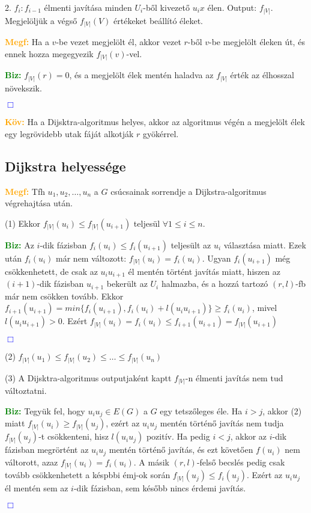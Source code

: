 \documentclass[12pt]{article}
\begin{document}
			2. $f_i:f_{i-1}$ élmenti javítása minden $U_i$-ből kivezető $u_ix$ élen. Output: $f_{|V|}$. Megjelöljük a végső $f_{|V|}(V)$ értékeket beállító éleket.
			
			\textcolor{orange}{\textbf{Megf:}} Ha a $v$-be vezet megjelölt él, akkor vezet $r$-ből $v$-be megjelölt éleken út, és ennek hozza megegyezik $f_{|V|} (v)$-vel.

			\textcolor{green}{\textbf{Biz:}} $f_{|V|} (r) = 0$, és a megjelölt élek mentén haladva az $f_{|V|}$ érték az élhosszal növekszik. \raggedright \textcolor{blue}{$\Box$}

			\textcolor{orange}{\textbf{Köv:}} Ha a Dijsktra-algoritmus helyes, akkor az algoritmus végén a megjelölt élek egy legrövidebb utak fáját alkotják $r$ gyökérrel.

		\subsection{Dijkstra helyessége}
				
			\textcolor{orange}{\textbf{Megf:}} Tfh $u_1, u_2, \dots, u_n$ a $G$ csúcsainak sorrendje a Dijkstra-algoritmus végrehajtása után. 

			(1) Ekkor $f_{|V|}(u_i) \leq f_{|V|}(u_{i+1})$ teljesül $\forall 1 \leq i \leq n$.

			\textcolor{green}{\textbf{Biz:}} Az $i$-dik fázisban $f_i(u_i) \leq f_i(u_{i+1})$ teljesült az $u_i$ választása miatt. Ezek után $f_i(u_i)$ már nem változott: $f_{|V|}(u_i) = f_i(u_i)$. Ugyan $f_i(u_{i+1})$ még csökkenhetett, de csak az $u_iu_{i+1}$ él mentén történt javítás miatt, hiszen az $(i+1)$-dik fázisban $u_{i+1}$ bekerült az $U_i$ halmazba, és a hozzá tartozó $(r,l)$-fb már nem csökken tovább. Ekkor $f_{i+1}(u_{i+1}) = min \{f_i(u_{i+1}),f_i(u_i)+l(u_iu_{i+1})\} \geq f_i(u_i)$, mivel $l(u_iu_{i+1}) > 0$. Ezért $f_{|V|}(u_i) = f_i(u_i) \leq f_{i+1}(u_{i+1}) = f_{|V|}(u_{i+1})$ \raggedright \textcolor{blue}{$\Box$}

			(2) $f_{|V|}(u_1) \leq f_{|V|}(u_2) \leq \dots \leq f_{|V|}(u_n)$

			(3) A Dijsktra-algoritmus outputjaként kaptt $f_{|V|}$-n élmenti javítás nem tud változtatni.
 
			\textcolor{green}{\textbf{Biz:}} Tegyük fel, hogy $u_iu_j \in E(G)$ a $G$ egy tetszőleges éle. Ha $i > j$, akkor (2) miatt $f_{|V|}(u_i) \geq f_{|V|}(u_j)$, ezért az $u_iu_j$ mentén történő javítás nem tudja $f_{|V|}(u_j)$-t csökkenteni, hisz $l(u_iu_j)$ pozitív. Ha pedig $i < j$, akkor az $i$-dik fázisban megrörtént az $u_iu_j$ mentén történő javítás, és ezt követően $f(u_i)$  nem váltorott, azaz $f_{|V|}(u_i) = f_i(u_i)$. A másik $(r,l)$-felső becslés pedig csak tovább csökkenhetett a késpbbi émj-ok során $f_{|V|}(u_j) \leq f_i(u_j)$. Ezért az $u_iu_j$ él mentén sem az $i$-dik fázisban, sem később nincs érdemi javítás. \raggedright \textcolor{blue}{$\Box$}
\end{document}
